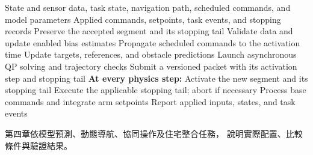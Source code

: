 \begin{algorithm}[htbp]
    \small
    \caption{具命令承接與停止備援之全身預測控制}
    \label{alg:wholebody_predictive_control}
    \begin{algorithmic}[1]
        \Require State and sensor data, task state, navigation path,
                 scheduled commands, and model parameters
        \Ensure Applied commands, setpoints, task events, and stopping records
        \State Preserve the accepted segment and its stopping tail
                \State Validate data and update enabled bias estimates
                \State Propagate scheduled commands to the activation time
                \State Update targets, references, and obstacle predictions
                \State Launch asynchronous QP solving and trajectory checks
            \EndIf
                \State Submit a versioned packet with its activation step and stopping tail
            \EndIf
            \Statex \textbf{At every physics step:}
                \State Activate the new segment and its stopping tail
                \State Execute the applicable stopping tail; abort if necessary
            \EndIf
            \State Process base commands and integrate arm setpoints
            \State Report applied inputs, states, and task events
        \EndWhile
    \end{algorithmic}
\end{algorithm}

第四章依模型預測、動態導航、協同操作及住宅整合任務，
說明實際配置、比較條件與驗證結果。
